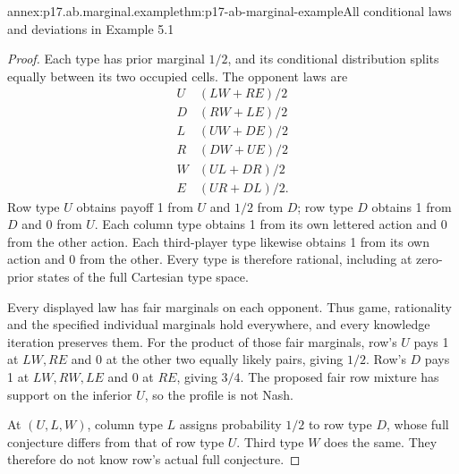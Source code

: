 \begin{annexitem}{annex:p17.ab.marginal.example}{thm:p17-ab-marginal-example}{All conditional laws and deviations in Example 5.1}
\begin{proof}
Each type has prior marginal \(1/2\), and its conditional
distribution splits equally between its two occupied cells.
The opponent laws are
\[
 \begin{array}{c|l}
 U&(LW+RE)/2\\D&(RW+LE)/2\\
 L&(UW+DE)/2\\R&(DW+UE)/2\\
 W&(UL+DR)/2\\E&(UR+DL)/2 .
 \end{array}
\]
Row type \(U\) obtains payoff 1 from \(U\) and \(1/2\) from
\(D\); row type \(D\) obtains 1 from \(D\) and 0 from \(U\).
Each column type obtains 1 from its own lettered action
and 0 from the other action. Each third-player type likewise
obtains 1 from its own action and 0 from the other.
Every type is therefore rational, including at zero-prior
states of the full Cartesian type space.

Every displayed law has fair marginals on each opponent.
Thus game, rationality and the specified individual marginals
hold everywhere, and every knowledge iteration preserves them.
For the product of those fair marginals, row's \(U\) pays 1
at \(LW,RE\) and 0 at the other two equally likely pairs,
giving \(1/2\). Row's \(D\) pays 1 at \(LW,RW,LE\) and
0 at \(RE\), giving \(3/4\). The proposed fair row mixture
has support on the inferior \(U\), so the profile is not Nash.

At \((U,L,W)\), column type \(L\) assigns probability \(1/2\)
to row type \(D\), whose full conjecture differs from that
of row type \(U\). Third type \(W\) does the same.
They therefore do not know row's actual full conjecture.
\end{proof}
\end{annexitem}


